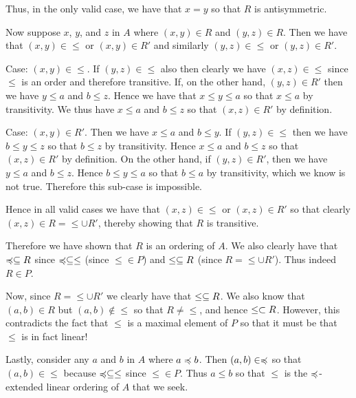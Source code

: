{{    Thus, in the only valid case, we have that $x=y$ so that $R$ is antisymmetric.

    Now suppose $x$, $y$, and $z$ in $A$ where $(x,y) \in R$ and $(y,z) \in R$.
    Then we have that $(x,y) \in \leq$ or $(x,y) \in R'$ and similarly $(y,z) \in \leq$ or $(y,z) \in R'$.

    Case: $(x,y) \in \leq$.
    If $(y,z) \in \leq$ also then clearly we have $(x,z) \in \leq$ since $\leq$ is an order and therefore transitive.
    If, on the other hand, $(y,z) \in R'$ then we have $y \leq a$ and $b \leq z$.
    Hence we have that $x \leq y \leq a$ so that $x \leq a$ by transitivity.
    We thus have $x \leq a$ and $b \leq z$ so that $(x,z) \in R'$ by definition.

    Case: $(x,y) \in R'$.
    Then we have $x \leq a$ and $b \leq y$.
    If $(y,z) \in \leq$ then we have $b \leq y \leq z$ so that $b \leq z$ by transitivity.
    Hence $x \leq a$ and $b \leq z$ so that $(x,z) \in R'$ by definition.
    On the other hand, if $(y,z) \in R'$, then we have $y \leq a$ and $b \leq z$.
    Hence $b \leq y \leq a$ so that $b \leq a$ by transitivity, which we know is not true.
    Therefore this sub-case is impossible.

    Hence in all valid cases we have that $(x,z) \in \leq$ or $(x,z) \in R'$ so that clearly $(x,z) \in R = \leq \cup R'$, thereby showing that $R$ is transitive.

    Therefore we have shown that $R$ is an ordering of $A$.
    We also clearly have that $\prece \ss R$ since $\prece \ss \leq$ (since $\leq \in P$) and $\leq \ss R$ (since $R = \leq \cup R'$).
    Thus indeed $R \in P$.

    Now, since $R = \leq \cup R'$ we clearly have that $\leq \ss R$.
    We also know that $(a,b) \in R$ but $(a,b) \notin \leq$ so that $R \neq \leq$, and hence $\leq \pss R$.
    However, this contradicts the fact that $\leq$ is a maximal element of $P$ so that it must be that $\leq$ is in fact linear!

    Lastly, consider any $a$ and $b$ in $A$ where $a \prece b$.
    Then $(a,b) \in \prece$ so that $(a,b) \in \leq$ because $\prece \ss \leq$ since $\leq \in P$.
    Thus $a \leq b$ so that $\leq$ is the $\prece$-extended linear ordering of $A$ that we seek.
  }
}

